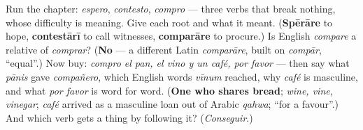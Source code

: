 \begin{tcolorbox}[breakable,colback=teal!4,colframe=teal!35!black,title={Before you move on}]
Run the chapter: \emph{espero}, \emph{contesto}, \emph{compro} — three verbs that break nothing, whose difficulty is meaning. Give each root and what it meant. (\textbf{Spērāre} to hope, \textbf{contestārī} to call witnesses, \textbf{comparāre} to procure.) Is English \emph{compare} a relative of \emph{comprar}? (\textbf{No} — a different Latin \emph{comparāre}, built on \emph{compār}, \textquotedblleft{}equal\textquotedblright{}.) Now buy: \emph{compro el pan, el vino y un café, por favor} — then say what \emph{pānis} gave \emph{compañero}, which English words \emph{vīnum} reached, why \emph{café} is masculine, and what \emph{por favor} is word for word. (\textbf{One who shares bread}; \emph{wine, vine, vinegar}; \emph{café} arrived as a masculine loan out of Arabic \emph{qahwa}; \textquotedblleft{}for a favour\textquotedblright{}.) And which verb gets a thing by following it? (\emph{Conseguir}.)
\end{tcolorbox}
